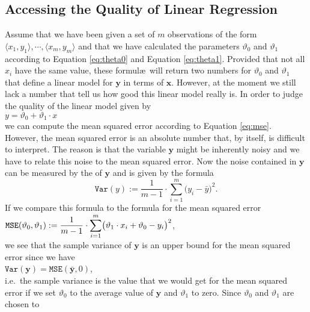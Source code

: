 \subsection{Accessing the Quality of Linear Regression}
Assume that we have been given a set of $m$ observations of the form $\langle x_1, y_1\rangle, \cdots, \langle x_m, y_m\rangle$  
and that we have calculated the parameters $\vartheta_0$ and $\vartheta_1$ according to Equation
\ref{eq:theta0} and Equation \ref{eq:theta1}.  Provided that not all $x_i$ have the same value, these
formul\ae\ will return two numbers for $\vartheta_0$ and $\vartheta_1$ that define a linear model for
$\mathbf{y}$ in terms of $\mathbf{x}$.  However, at the moment we still lack a number that tell us how good
this linear model really is.  In order to judge the quality of the linear model given by 
\\[0.2cm]
\hspace*{1.3cm}
$y = \vartheta_0 + \vartheta_1 \cdot x$
\\[0.2cm]
we can compute the mean squared error according to Equation \ref{eq:mse}.  However, the mean squared error 
is an absolute number that, by itself, is difficult to interpret.  The reason is that the variable $\mathbf{y}$ might be
inherently noisy and we have to relate this noise to the mean squared error.  Now the noise contained in $\mathbf{y}$
can be measured by the  of $\mathbf{y}$ and is given by the formula
\begin{equation}
  \label{eq:var}
  \mathtt{Var}(y) := \frac{1}{m-1} \cdot \sum\limits_{i=1}^m \bigl(y_i - \bar{y}\bigr)^2.
\end{equation}
If we compare this formula to the formula for the mean squared error
\\[0.2cm]
\hspace*{1.3cm}
$\displaystyle\mathtt{MSE}(\vartheta_0, \vartheta_1) := 
  \frac{1}{m-1} \cdot\sum\limits_{i=1}^m \bigl(\vartheta_1 \cdot x_i + \vartheta_0 - y_i\bigr)^2
$,
\\[0.2cm]
we see that the sample variance of $\mathbf{y}$ is an upper bound for the mean squared error since we have
\\[0.2cm]
\hspace*{1.3cm}
$\mathtt{Var}(\mathbf{y}) = \mathtt{MSE}(\bar{\mathbf{y}}, 0)$,
\\[0.2cm]
i.e.~the sample variance is the value that we would get for the mean squared error if we set $\vartheta_0$ to
the average value of $\mathbf{y}$ and $\vartheta_1$ to zero.  Since $\vartheta_0$ and $\vartheta_1$ are chosen to
